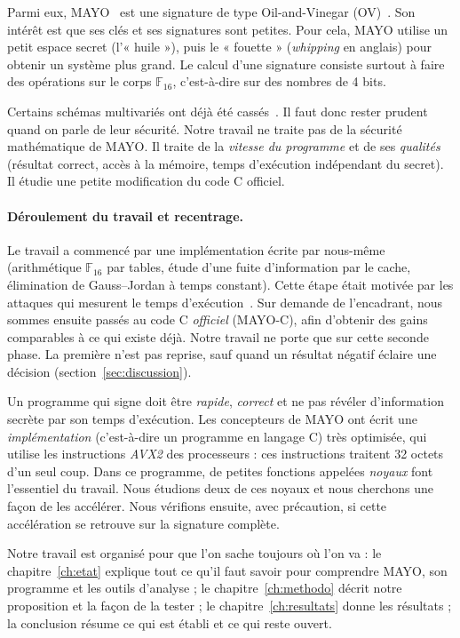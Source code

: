 Parmi eux, MAYO~\cite{mayo} est une signature de type Oil-and-Vinegar (OV)~\cite{patarin,kipnisshamir,uov}. Son intérêt est que ses clés et ses signatures sont petites. Pour cela, MAYO utilise un petit espace secret (l'« huile »), puis le « fouette » (\emph{whipping} en anglais) pour obtenir un système plus grand. Le calcul d'une signature consiste surtout à faire des opérations sur le corps $\mathbb{F}_{16}$, c'est-à-dire sur des nombres de 4 bits.

Certains schémas multivariés ont déjà été cassés~\cite{beullensrainbow}. Il faut donc rester prudent quand on parle de leur sécurité. Notre travail ne traite pas de la sécurité mathématique de MAYO. Il traite de la \emph{vitesse du programme} et de ses \emph{qualités} (résultat correct, accès à la mémoire, temps d'exécution indépendant du secret). Il étudie une petite modification du code C officiel.

\paragraph{Déroulement du travail et recentrage.} Le travail a commencé par une implémentation écrite par nous-même (arithmétique $\mathbb{F}_{16}$ par tables, étude d'une fuite d'information par le cache, élimination de Gauss--Jordan à temps constant). Cette étape était motivée par les attaques qui mesurent le temps d'exécution~\cite{kocher,bernstein}. Sur demande de l'encadrant, nous sommes ensuite passés au code C \emph{officiel} (MAYO-C), afin d'obtenir des gains comparables à ce qui existe déjà. Notre travail ne porte que sur cette seconde phase. La première n'est pas reprise, sauf quand un résultat négatif éclaire une décision (section~\ref{sec:discussion}).

Un programme qui signe doit être \emph{rapide}, \emph{correct} et ne pas révéler d'information secrète par son temps d'exécution. Les concepteurs de MAYO ont écrit une \emph{implémentation} (c'est-à-dire un programme en langage C) très optimisée, qui utilise les instructions \emph{AVX2} des processeurs : ces instructions traitent 32 octets d'un seul coup. Dans ce programme, de petites fonctions appelées \emph{noyaux} font l'essentiel du travail. Nous étudions deux de ces noyaux et nous cherchons une façon de les accélérer. Nous vérifions ensuite, avec précaution, si cette accélération se retrouve sur la signature complète.

Notre travail est organisé pour que l'on sache toujours où l'on va : le chapitre~\ref{ch:etat} explique tout ce qu'il faut savoir pour comprendre MAYO, son programme et les outils d'analyse ; le chapitre~\ref{ch:methodo} décrit notre proposition et la façon de la tester ; le chapitre~\ref{ch:resultats} donne les résultats ; la conclusion résume ce qui est établi et ce qui reste ouvert.

